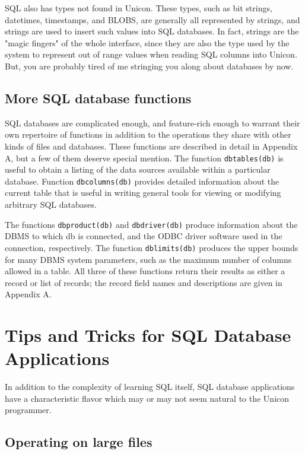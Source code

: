 SQL also has types not found in Unicon. These types, such as bit
strings, datetimes, timestamps, and BLOBS, are generally all
represented by strings, and strings are used to insert such values into
SQL databases. In fact, strings are the "magic
fingers" of the whole interface, since they are also the
type used by the system to represent out of range values when reading
SQL columns into Unicon. But, you are probably tired of me stringing
you along about databases by now.

\subsection{More SQL database functions}

SQL databases are complicated enough, and feature-rich enough to warrant
their own repertoire of functions in addition to the operations they
share with other kinds of files and databases. These functions are
described in detail in Appendix A, but a few of them deserve special
mention. The function \texttt{dbtables(db)} is useful to obtain a
listing of the data sources available within a particular database.
Function \texttt{dbcolumns(db)} provides detailed information about the
current table that is useful in writing general tools for viewing or
modifying arbitrary SQL databases.

The functions \texttt{dbproduct(db)} and \texttt{dbdriver(db)} produce
information about the DBMS to which db is connected, and the
ODBC driver software used in the connection, respectively.
The function \texttt{dblimits(db)} produces the upper bounds for many
DBMS system parameters, such as the maximum number of columns allowed
in a table. All three of these functions return their results as either
a record or list of records; the record field names and descriptions
are given in Appendix A.

\section{Tips and Tricks for SQL Database Applications}

In addition to the complexity of learning SQL itself, SQL database
applications have a characteristic flavor which may or may not seem
natural to the Unicon programmer.

\subsection{Operating on large files}

